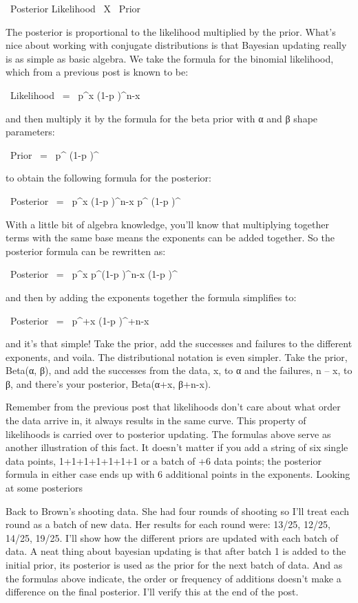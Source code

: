 \ Posterior \propto Likelihood \ X \ Prior

The posterior is proportional to the likelihood multiplied by the prior. What's nice about working with conjugate distributions is that Bayesian updating really is as simple as basic algebra. We take the formula for the binomial likelihood, which from a previous post is known to be:

\ Likelihood \ = \ p^x \big(1-p \big)^{n-x}  

and then multiply it by the formula for the beta prior with α and β shape parameters:

\ Prior \ = \ p^{} \big(1-p \big)^{}  

to obtain the following formula for the posterior:

\ Posterior \ = \ p^x \big(1-p \big)^{n-x} p^{} \big(1-p \big)^{}  

With a little bit of algebra knowledge, you'll know that multiplying together terms with the same base means the exponents can be added together. So the posterior formula can be rewritten as:

\ Posterior \ = \ p^x p^{}\big(1-p \big)^{n-x} \big(1-p \big)^{}

and then by adding the exponents together the formula simplifies to:

\ Posterior \ = \ p^{+x} \big(1-p \big)^{+n-x}  

and it's that simple! Take the prior, add the successes and failures to the different exponents, and voila. The distributional notation is even simpler. Take the prior, Beta(α, β), and add the successes from the data, x, to α and the failures, n – x, to β, and there's your posterior, Beta(α+x, β+n-x).

Remember from the previous post that likelihoods don't care about what order the data arrive in, it always results in the same curve. This property of likelihoods is carried over to posterior updating. The formulas above serve as another illustration of this fact. It doesn't matter if you add a string of six single data points, 1+1+1+1+1+1+1 or a batch of +6 data points; the posterior formula in either case ends up with 6 additional points in the exponents.
Looking at some posteriors

Back to Brown's shooting data. She had four rounds of shooting so I'll treat each round as a batch of new data. Her results for each round were: 13/25, 12/25, 14/25, 19/25. I'll show how the different priors are updated with each batch of data. A neat thing about bayesian updating is that after batch 1 is added to the initial prior, its posterior is used as the prior for the next batch of data. And as the formulas above indicate, the order or frequency of additions doesn't make a difference on the final posterior. I'll verify this at the end of the post.


